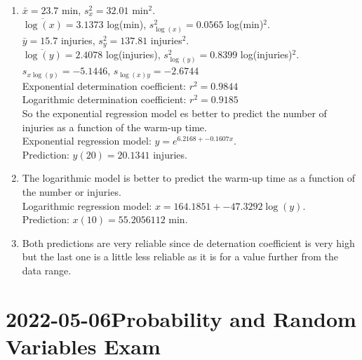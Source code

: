 \documentclass[
  a4paper,
]{scrreport}
\theoremstyle{definition}
\theoremstyle{remark}
\begin{document}
\begin{tcolorbox}
\begin{enumerate}
\def\labelenumi{\alph{enumi}.}
\item
  \(\bar x=23.7\) min, \(s_x^2=32.01\) min\(^2\).\\
  \(\overline{\log(x)}=3.1373\) log(min), \(s_{\log(x)}^2=0.0565\)
  log(min)\(^2\).\\
  \(\bar y=15.7\) injuries, \(s_y^2=137.81\) injuries\(^2\).\\
  \(\overline{\log(y)}=2.4078\) log(injuries), \(s_{\log(y)}^2=0.8399\)
  log(injuries)\(^2\).\\
  \(s_{x\log(y)}=-5.1446\), \(s_{\log(x)y}=-2.6744\)\\
  Exponential determination coefficient: \(r^2=0.9844\)\\
  Logarithmic determination coefficient: \(r^2=0.9185\)\\
  So the exponential regression model es better to predict the number of
  injuries as a function of the warm-up time.\\
  Exponential regression model: \(y=e^{6.2168+-0.1607x}\).\\
  Prediction: \(y(20)=20.1341\) injuries.
\item
  The logarithmic model is better to predict the warm-up time as a
  function of the number or injuries.\\
  Logarithmic regression model: \(x=164.1851+-47.3292\log(y)\).\\
  Prediction: \(x(10)=55.2056112\) min.
\item
  Both predictions are very reliable since de deternation coefficient is
  very high but the last one is a little less reliable as it is for a
  value further from the data range.
\end{enumerate}

\end{tcolorbox}


\hypertarget{probability-and-random-variables-exam}{%
\chapter{\texorpdfstring{2022-05-06Probability and Random Variables
Exam}{2022-05-06 Probability and Random Variables Exam}}\label{probability-and-random-variables-exam}}
\end{document}
